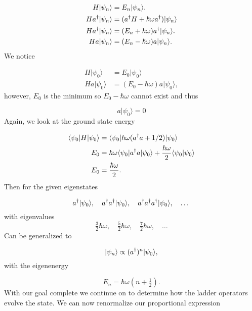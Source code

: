 \begin{align}
  H | \psi_n \rangle &= E_n | \psi_n \rangle. \nonumber \\
  Ha^{\dagger} | \psi_n \rangle &= (a^{\dagger} H + \hbar \omega a^{\dagger}) |\psi_n\rangle \nonumber \\
  Ha^{\dagger} | \psi_n \rangle &= (E_n +\hbar \omega) a^{\dagger} |\psi_n\rangle. \nonumber \\
  H a |\psi_n \rangle &= (E_n - \hbar \omega) a |\psi_n\rangle. \nonumber \\
\end{align}
We notice

\begin{align}
  H|\psi_0\rangle &= E_0 |\psi_0\rangle \nonumber \\
  Ha|\psi_0\rangle &= (E_0-\hbar \omega) a|\psi_0\rangle,
\end{align}
however, $E_0$ is the minimum so $E_0-\hbar \omega$ cannot exist and thus

\begin{equation}
  a |\psi_0\rangle = 0
\end{equation}
Again, we look at the ground state energy

\begin{align}
  \langle \psi_0 | H | \psi_0 \rangle &= \langle \psi_0 | \hbar \omega(a^{\dagger} a +1/2) | \psi_0 \rangle \nonumber \\
  E_0 &= \hbar \omega \langle \psi_0 | a^{\dagger} a | \psi_0 \rangle + \dfrac{\hbar\omega}{2} \langle \psi_0 | \psi_0 \rangle \nonumber \\
  E_0 &= \dfrac{\hbar \omega}{2}.
\end{align}
Then for the given eigenstates

\begin{equation*}
  a^{\dagger}|\psi_0\rangle, \quad a^{\dagger}a^{\dagger}|\psi_0\rangle, \quad a^{\dagger}a^{\dagger}a^{\dagger}|\psi_0\rangle, \quad \dots
\end{equation*}
with eigenvalues
\begin{equation*}
  \tfrac{3}{2} \hbar\omega, \quad \tfrac{5}{2} \hbar\omega, \quad \tfrac{7}{2} \hbar\omega, \quad \dots
\end{equation*}
Can be generalized to

\begin{equation*}
  |\psi_n\rangle \propto ( a^{\dagger} )^n|\psi_0\rangle,
\end{equation*}
with the eigenenergy

\begin{equation*}
  E_n = \hbar\omega \left( n + \tfrac{1}{2} \right).
\end{equation*}
With our goal complete we continue on to determine how the ladder operators evolve the state.
We can now renormalize our proportional expression

